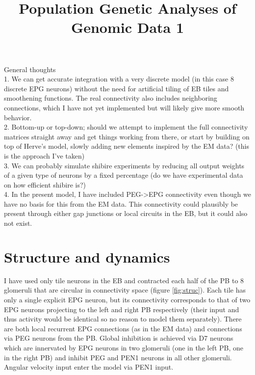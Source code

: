 \documentclass{article}
\title{Population Genetic Analyses of Genomic Data 1}
\begin{document}

\begin{center}
\end{center}


General thoughts\\
1. We can get accurate integration with a very discrete model (in this case 8 discrete EPG neurons) without the need for artificial tiling of EB tiles and smoothening functions. The real connectivity also includes neighboring connections, which I have not yet implemented but will likely give more smooth behavior.\\
2. Bottom-up or top-down; should we attempt to implement the full connectivity matrices straight away and get things working from there, or start by building on top of Herve's model, slowly adding new elements inspired by the EM data? (this is the approach I've taken)\\
3. We can probably simulate shibire experiments by reducing all output weights of a given type of neurons by a fixed percentage (do we have experimental data on how efficient shibire is?)\\
4. In the present model, I have included PEG->EPG connectivity even though we have no basis for this from the EM data. This connectivity could plausibly be present through either gap junctions or local circuits in the EB, but it could also not exist.


\section*{Structure and dynamics}

I have used only tile neurons in the EB and contracted each half of the PB to 8 glomeruli that are circular in connectivity space (figure \ref{fig:struc}). Each tile has only a single explicit EPG neuron, but its connectivity corresponds to that of two EPG neurons projecting to the left and right PB respectively (their input and thus activity would be identical so no reason to model them separately). There are both local recurrent EPG connections (as in the EM data) and connections via PEG neurons from the PB. Global inhibition is achieved via D7 neurons which are innervated by EPG neurons in two glomeruli (one in the left PB, one in the right PB) and inhibit PEG and PEN1 neurons in all other glomeruli. Angular velocity input enter the model via PEN1 input.
\end{document}
